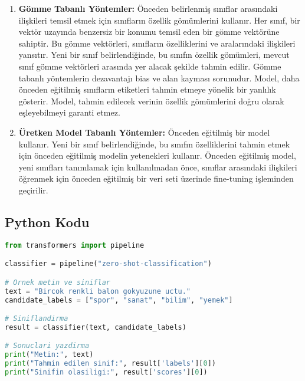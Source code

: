 \begin{enumerate}
    \item \textbf{Gömme Tabanlı Yöntemler:} Önceden belirlenmiş sınıflar arasındaki ilişkileri temsil etmek için sınıfların özellik gömümlerini kullanır. Her sınıf, bir vektör uzayında benzersiz bir konumu temsil eden bir gömme vektörüne sahiptir. Bu gömme vektörleri, sınıfların özelliklerini ve aralarındaki ilişkileri yansıtır. Yeni bir sınıf belirlendiğinde, bu sınıfın özellik gömümleri, mevcut sınıf gömme vektörleri arasında yer alacak şekilde tahmin edilir. Gömme tabanlı yöntemlerin dezavantajı bias ve alan kayması sorunudur. Model, daha önceden eğitilmiş sınıfların etiketleri tahmin etmeye yönelik bir yanlılık gösterir. Model, tahmin edilecek verinin özellik gömümlerini doğru olarak eşleyebilmeyi garanti etmez.
    \item \textbf{Üretken Model Tabanlı Yöntemler:} Önceden eğitilmiş bir model kullanır. Yeni bir sınıf belirlendiğinde, bu sınıfın özelliklerini tahmin etmek için önceden eğitilmiş modelin yetenekleri kullanır. Önceden eğitilmiş model, yeni sınıfları tanımlamak için kullanılmadan önce, sınıflar arasındaki ilişkileri öğrenmek için önceden eğitilmiş bir veri seti üzerinde fine-tuning işleminden geçirilir.
\end{enumerate}

\subsection{Python Kodu}

\begin{lstlisting}[language=Python]
from transformers import pipeline

classifier = pipeline("zero-shot-classification")

# Ornek metin ve siniflar
text = "Bircok renkli balon gokyuzune uctu."
candidate_labels = ["spor", "sanat", "bilim", "yemek"]

# Siniflandirma
result = classifier(text, candidate_labels)

# Sonuclari yazdirma
print("Metin:", text)
print("Tahmin edilen sinif:", result['labels'][0])
print("Sinifin olasiligi:", result['scores'][0])
\end{lstlisting}

\newpage